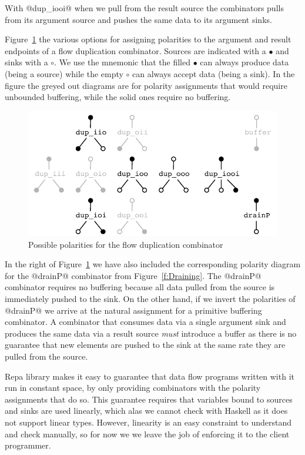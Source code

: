 With @dup_iooi@ when we pull from the result source the combinators pulls from its argument source and pushes the same data to its argument sinks. 

Figure~\ref{f:Polarity} the various options for assigning polarities to the argument and result endpoints of a flow duplication combinator. Sources are indicated with a $\bullet$ and sinks with a $\circ$. We use the mnemonic that the filled $\bullet$ can always produce data (being a source) while the empty $\circ$ can always accept data (being a sink). In the figure the greyed out diagrams are for polarity assignments that would require unbounded buffering, while the solid ones require no buffering.

\begin{figure}
\includegraphics[scale=0.7]{figures/polarity.pdf}

\caption{Possible polarities for the flow duplication combinator}
\label{f:Polarity}
\end{figure}

In the right of Figure~\ref{f:Polarity} we have also included the corresponding polarity diagram for the @drainP@ combinator from Figure~\ref{f:Draining}. The @drainP@ combinator requires no buffering because all data pulled from the source is immediately pushed to the sink. On the other hand, if we invert the polarities of @drainP@ we arrive at the natural assignment for a primitive buffering combinator. A combinator that consumes data via a single argument sink and produces the same data via a result source \emph{must} introduce a buffer as there is no guarantee that new elements are pushed to the sink at the same rate they are pulled from the source. 

Repa library makes it easy to guarantee that data flow programs written with it run in constant space, by only providing combinators with the polarity assignments that do so. This guarantee requires that variables bound to sources and sinks are used linearly, which alas we cannot check with Haskell as it does not support linear types. However, linearity is an easy constraint to understand and check manually, so for now we we leave the job of enforcing it to the client programmer.


